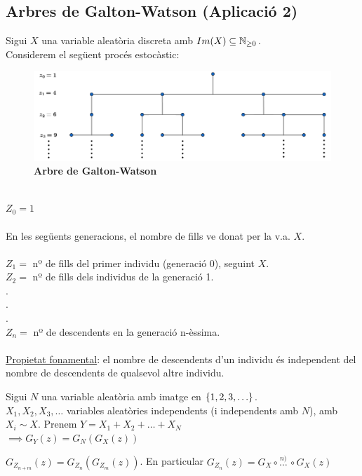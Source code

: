 \subsection{Arbres de Galton-Watson (Aplicació 2)}
Sigui $X$ una variable aleatòria discreta amb $Im(X)\subseteq \mathbb{N}_{\geq 0}$. \\
Considerem el següent procés estocàstic: \\
\begin{figure}[h]
\includegraphics[scale=0.45]{G-WTree.png}
\caption*{\textbf{Arbre de Galton-Watson}}
\centering
\end{figure}
\\
$Z_{0} = 1$\\\\
En les següents generacions, el nombre de fills ve donat per la v.a. $X$.\\\\
$Z_{1} =$ nº de fills del primer individu (generació 0), seguint $X$.\\
$Z_{2} =$ nº de fills dels individus de la generació 1.\\
.\\
.\\
.\\
$Z_{n} =$ nº de descendents en la generació n-èssima.\\\\

\underline{Propietat fonamental}: el nombre de descendents d'un individu és independent del 
nombre de descendents de qualsevol altre individu. \\

\begin{lema}
  Sigui $N$ una variable aleatòria amb imatge en $\left\{1,2,3,\ldots\right\}$.\\
  $X_{1},X_{2},X_{3},\ldots$ variables aleatòries independents (i independents amb $N$), amb 
  $X_{i}\sim X$. Prenem $Y=X_{1}+X_{2}+\ldots +X_{N}$\\
  $\implies G_{Y}(z)=G_{N}(G_{X}(z))$
\end{lema}

\begin{prop}
  $G_{Z_{n+m}}(z) = G_{Z_{n}}(G_{Z_{m}}(z))$. En particular $G_{Z_{n}}(z)=G_{X}\circ \overset{n)}{\ldots} \, \circ G_{X}(z)$
\end{prop}

